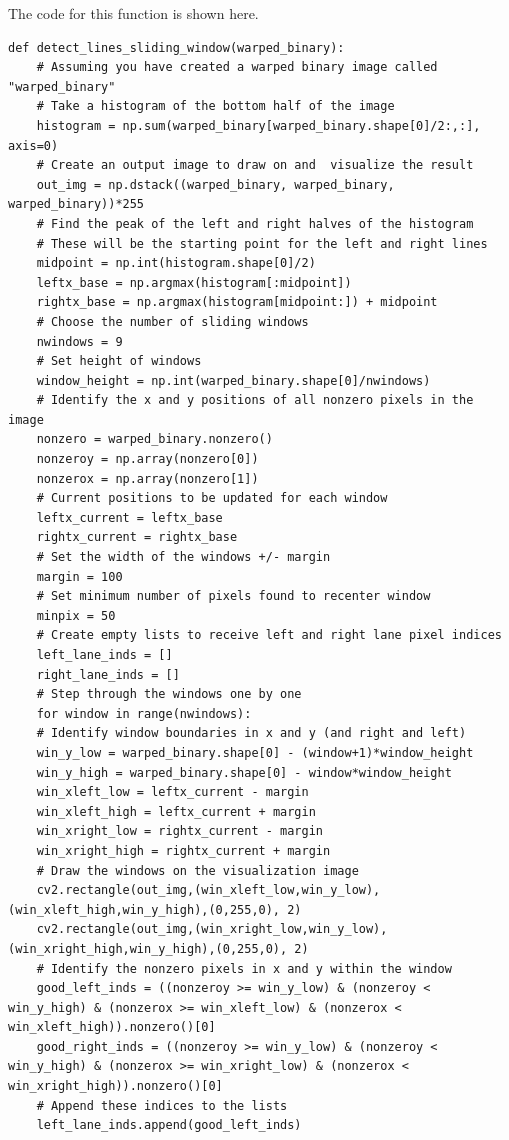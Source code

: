 \documentclass[11pt]{article}
\begin{document}
The code for this function is shown here. 

\begin{verbatim}
def detect_lines_sliding_window(warped_binary):
    # Assuming you have created a warped binary image called "warped_binary"
    # Take a histogram of the bottom half of the image
    histogram = np.sum(warped_binary[warped_binary.shape[0]/2:,:], axis=0)
    # Create an output image to draw on and  visualize the result
    out_img = np.dstack((warped_binary, warped_binary, warped_binary))*255
    # Find the peak of the left and right halves of the histogram
    # These will be the starting point for the left and right lines
    midpoint = np.int(histogram.shape[0]/2)
    leftx_base = np.argmax(histogram[:midpoint])
    rightx_base = np.argmax(histogram[midpoint:]) + midpoint
    # Choose the number of sliding windows
    nwindows = 9
    # Set height of windows
    window_height = np.int(warped_binary.shape[0]/nwindows)
    # Identify the x and y positions of all nonzero pixels in the image
    nonzero = warped_binary.nonzero()
    nonzeroy = np.array(nonzero[0])
    nonzerox = np.array(nonzero[1])
    # Current positions to be updated for each window
    leftx_current = leftx_base
    rightx_current = rightx_base
    # Set the width of the windows +/- margin
    margin = 100
    # Set minimum number of pixels found to recenter window
    minpix = 50
    # Create empty lists to receive left and right lane pixel indices
    left_lane_inds = []
    right_lane_inds = []
    # Step through the windows one by one
    for window in range(nwindows):
	# Identify window boundaries in x and y (and right and left)
	win_y_low = warped_binary.shape[0] - (window+1)*window_height
	win_y_high = warped_binary.shape[0] - window*window_height
	win_xleft_low = leftx_current - margin
	win_xleft_high = leftx_current + margin
	win_xright_low = rightx_current - margin
	win_xright_high = rightx_current + margin
	# Draw the windows on the visualization image
	cv2.rectangle(out_img,(win_xleft_low,win_y_low),(win_xleft_high,win_y_high),(0,255,0), 2) 
	cv2.rectangle(out_img,(win_xright_low,win_y_low),(win_xright_high,win_y_high),(0,255,0), 2) 
	# Identify the nonzero pixels in x and y within the window
	good_left_inds = ((nonzeroy >= win_y_low) & (nonzeroy < win_y_high) & (nonzerox >= win_xleft_low) & (nonzerox < win_xleft_high)).nonzero()[0]
	good_right_inds = ((nonzeroy >= win_y_low) & (nonzeroy < win_y_high) & (nonzerox >= win_xright_low) & (nonzerox < win_xright_high)).nonzero()[0]
	# Append these indices to the lists
	left_lane_inds.append(good_left_inds)

\end{verbatim}
\end{document}
